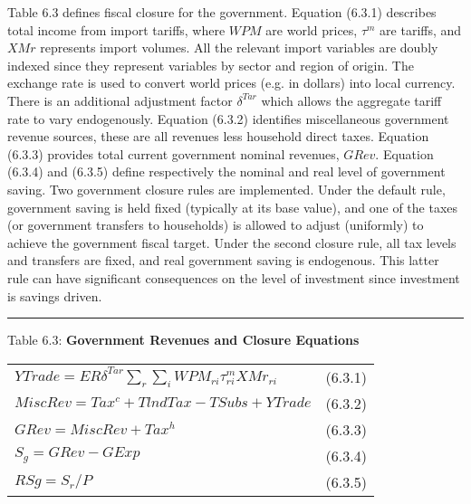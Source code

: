 \documentclass[12pt]{article}
\begin{document}
Table 6.3 defines fiscal closure for the government. Equation (6.3.1) describes total income from import tariffs, where $WPM$ are world prices, $\tau^m$ are tariffs, and $XMr$ represents import volumes. All the relevant import variables are doubly indexed since they represent variables by sector and region of origin. The exchange rate is used to convert world prices (e.g. in dollars) into local currency. There is an additional adjustment factor $\delta^{Tar}$ which allows the aggregate tariff rate to vary endogenously. Equation (6.3.2) identifies miscellaneous government revenue sources, these are all revenues less household direct taxes. Equation (6.3.3) provides total current government nominal revenues, $GRev$. Equation (6.3.4) and (6.3.5) define respectively the nominal and real level of government saving. Two government closure rules are implemented. Under the default rule, government saving is held fixed (typically at its base value), and one of the taxes (or government transfers to households) is allowed to adjust (uniformly) to achieve the government fiscal target. Under the second closure rule, all tax levels and transfers are fixed, and real government saving is endogenous. This latter rule can have significant consequences on the level of investment since investment is savings driven.

\noindent\rule{\linewidth}{0.4pt}
\begin{center}
\begin{large}
{\centering Table 6.3: \textbf{Government Revenues and Closure Equations} \par}

\begin{tabular}{>{\raggedright}p{} l}

$YTrade = ER\delta^{Tar} \displaystyle \sum_r \sum_i WPM_{ri}\tau^m_{ri}XMr_{ri}$ & (6.3.1)\\[15pt]

$MiscRev = Tax^c + TlndTax - TSubs + YTrade$ & (6.3.2)\\[15pt]

$GRev = MiscRev + Tax^h$ & (6.3.3)\\[15pt]

$S_g = GRev - GExp$ & (6.3.4)\\[15pt]

$RSg = S_r / P$ & (6.3.5)\\[20pt]

\hline
\end{tabular}
\end{large}
\end{center}
\end{document}
